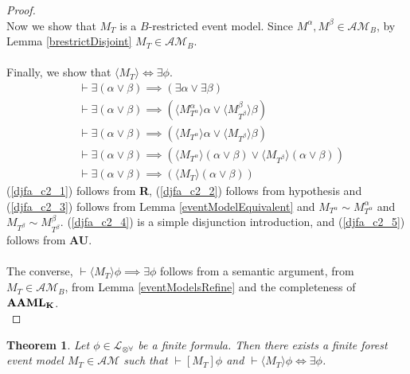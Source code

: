 \documentclass[12pt, a4paper, titlepage]{scrartcl}
\newtheorem{thm}{Theorem}[subsection]
\numberwithin{equation}{section}
\newcommand{\sqex}[1]{[{#1}]}
\newcommand{\anex}[1]{\langle {#1} \rangle}
\newcommand{\lang}{\mathcal{L}}
\newcommand{\langArbAct}{\lang_{\otimes\forall}}
\newcommand{\AXK}{{\bf K}}
\newcommand{\AXAAML}{${\bf AAML_{\AXK}}$}
\newcommand{\axAU}{{\bf AU}}
\newcommand{\axR}{{\bf R}}
\newcommand{\eventClass}{\mathcal{AM}}
\begin{document}
\begin{proof}
\\
Now we show that $M_T$ is a $B$-restricted event model.
Since $M^\alpha, M^\beta \in \eventClass_B$, by Lemma \ref{brestrictDisjoint} $M_T \in
\eventClass_B$.\\
\\
Finally, we show that $\anex{M_T} \iff \exists \phi$.
\begin{align}
	&\vdash \exists (\alpha \lor \beta) \implies (\exists \alpha \lor \exists \beta) \label{djfa_c2_1} \\
	&\vdash \exists (\alpha \lor \beta) \implies (\anex{ M^\alpha_{T^\alpha} } \alpha \lor
			\anex{ M^\beta_{T^\beta} }\beta) \label{djfa_c2_2}\\
	&\vdash \exists (\alpha \lor \beta) \implies (\anex{M_{T^\alpha}} \alpha \lor \anex{M_{T^\beta}}
			\beta)\label{djfa_c2_3}\\
	&\vdash \exists (\alpha \lor \beta) \implies (\anex{M_{T^\alpha}} (\alpha \lor \beta) \lor \anex{M_{T^\beta}}
			(\alpha \lor \beta))\label{djfa_c2_4}\\
	&\vdash \exists (\alpha \lor \beta) \implies (\anex{M_T} (\alpha \lor \beta))\label{djfa_c2_5}
\end{align}
(\ref{djfa_c2_1}) follows from \axR, (\ref{djfa_c2_2}) follows from hypothesis and
(\ref{djfa_c2_3}) follows from Lemma \ref{eventModelEquivalent} and $M_{T^\alpha} \sim M^\alpha_{T^\alpha}$ and $M_{T^\beta}
\sim M^\beta_{T^\beta}$.
(\ref{djfa_c2_4}) is a simple disjunction introduction, and (\ref{djfa_c2_5}) follows from \axAU.\\
\\
The converse, $\vdash \anex{M_T} \phi \implies \exists \phi$ follows from a semantic
argument, from $M_T \in \eventClass_B$, from Lemma \ref{eventModelsRefine} and the completeness of \AXAAML.\\
\end{proof}

\begin{thm} \label{goalAchievementK}
Let $\phi \in \langArbAct$ be a finite formula.
Then there exists a finite forest event model $M_T \in \eventClass$ such that
$\vdash \sqex{M_T}\phi$ and $\vdash \anex{ M_T } \phi \iff \exists \phi$.
\end{thm}
\end{document}
